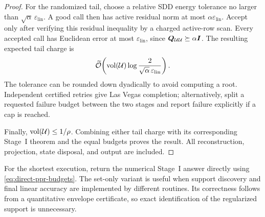 \begin{proof}
For the randomized tail, choose a relative SDD energy tolerance no larger
than $\sqrt\alpha\,\varepsilon_{\mathrm{lin}}$. A good call then has active
residual norm at most $\alpha\varepsilon_{\mathrm{lin}}$.
Accept only after verifying this residual inequality by a charged active-row
scan. Every accepted call has Euclidean error at most
$\varepsilon_{\mathrm{lin}}$, since $\bm{Q}_{\mathcal{U}\mathcal{U}}\succeq\alpha\bm{I}$.
The resulting expected tail charge is
\begin{equation*}
 \widetilde{\mathcal{O}}\!\left(\operatorname{vol}(\mathcal{U})
          \log\frac2{\sqrt\alpha\,\varepsilon_{\mathrm{lin}}}\right).
\end{equation*}
The tolerance can be rounded down dyadically to avoid computing a root.
Independent certified retries give Las Vegas completion; alternatively,
split a requested failure budget between the two stages and report failure
explicitly if a cap is reached.

Finally, $\operatorname{vol}(\mathcal{U})\leq1/\rho$. Combining either tail charge with its
corresponding Stage~I theorem and the equal budgets proves the result.
All reconstruction, projection, state disposal, and output are included.
\end{proof}

For the shortest execution, return the numerical Stage~I answer directly
using \cref{eq:direct-ppr-budgets}. The set-only variant is useful when
support discovery and final linear accuracy are implemented by different
routines. Its correctness follows from a quantitative envelope certificate,
so exact identification of the regularized support is unnecessary.
